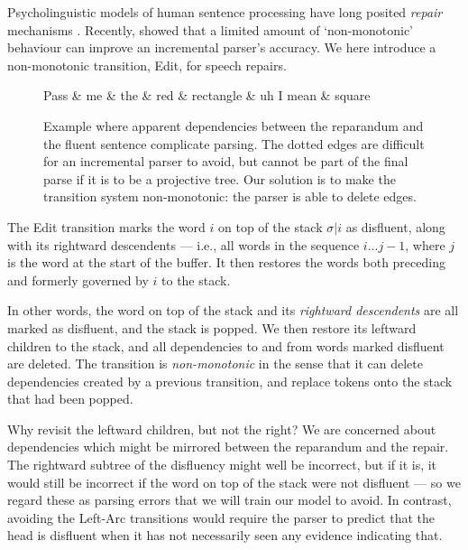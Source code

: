 \documentclass[11pt,letterpaper]{article}
\begin{document}
Psycholinguistic models of human sentence processing have long posited
\emph{repair} mechanisms \citep{FrazierRayner1982}.  Recently, \citet{honnibal:13}
showed that a limited amount of `non-monotonic' behaviour can 
improve an incremental parser's accuracy.
We here introduce a non-monotonic transition, Edit, for speech
repairs. 

\begin{figure}
    \small
\begin{dependency}[theme=simple, segmented edge]
    \begin{deptext}[column sep=.075cm, row sep=.1ex]
    Pass \& me \& the \& red \& rectangle \& uh I mean \& square \\
    \end{deptext}
    \end{dependency}
    \caption{\small Example where apparent dependencies between the reparandum and the
    fluent sentence complicate parsing.  The dotted edges are difficult for an
    incremental parser to avoid, but cannot be part of the final parse if it is to
    be a projective tree. Our solution is to make the transition system non-monotonic:
    the parser is able to delete edges.
\label{fig:rectangle}}
\end{figure}

The Edit transition marks the word $i$ on top of the stack $\sigma | i$ as
disfluent, along with its rightward descendents --- i.e., all words in the
sequence $i...j-1$, where $j$ is the word at the start of the buffer. It then
restores the words both preceding and formerly governed by $i$ to the stack.

In other words, the word on top of the stack and its \emph{rightward descendents}
are all marked as disfluent, and the stack is popped. We then restore its
leftward children to the stack, and
all dependencies to and from words marked disfluent are deleted. 
The transition is \emph{non-monotonic} in the sense that it can delete dependencies
created by a previous transition, and replace tokens onto the stack that had been
popped.

Why revisit the leftward children, but not the right? We
are concerned about dependencies which might be mirrored between the reparandum
and the repair. The rightward subtree of the disfluency might well be incorrect,
but if it is, it would still be incorrect if the word on top of the stack were
not
disfluent --– so we regard these as parsing errors that we will train our model
to avoid. In contrast, avoiding the Left-Arc transitions would require the parser to
predict that the head is disfluent when it has not necessarily seen any evidence
indicating that.
\end{document}
